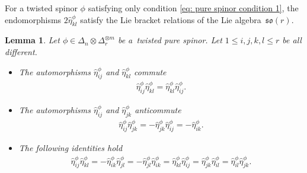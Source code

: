 \documentclass[pdftex]{sigma}
\numberwithin{equation}{section}
\newtheorem{Lemma}[Theorem]{Lemma}
\begin{document}
\begin{Remark} For a twisted spinor $\phi$ satisfying only condition \eqref{eq: pure spinor condition 1}, the endomorphisms $2\hat\eta_{kl}^\phi$ satisfy the Lie bracket relations of the Lie algebra~$\mathfrak{so}(r)$.
\end{Remark}

\begin{Lemma}\label{lemma:clifford-relations} Let $\phi\in\Delta_n\otimes\Delta_r^{\otimes m}$ be a~twisted pure spinor. Let $1\leq i,j,k,l\leq r$ be all different.
\begin{itemize}\itemsep=0pt
 \item The automorphisms $\hat\eta_{ij}^\phi$ and $\hat\eta_{kl}^\phi$ commute
\begin{gather}
\hat\eta_{ij}^\phi\hat\eta_{kl}^\phi=\hat\eta_{kl}^\phi\hat\eta_{ij}^\phi.\label{ij.kl=kl.ij}
\end{gather}
\item The automorphisms $\hat\eta_{ij}^\phi$
and $\hat\eta_{jk}^\phi$ anticommute
\begin{gather}
\hat\eta_{ij}^\phi\hat\eta_{jk}^\phi =-\hat\eta_{jk}^\phi\hat\eta_{ij}^\phi =- \hat\eta_{ik}^\phi.\label{ij.jk=-jk.ij}
\end{gather}
\item The following identities hold
\begin{gather}
 \hat\eta_{ij}^\phi\hat\eta_{kl}^\phi = -\hat\eta_{ik}^\phi\hat\eta_{jl}^\phi
 = -\hat\eta_{jl}^\phi\hat\eta_{ik}^\phi = \hat\eta_{kl}^\phi\hat\eta_{ij}^\phi = \hat\eta_{jk}^\phi\hat\eta_{il}^\phi
 = \hat\eta_{il}^\phi\hat\eta_{jk}^\phi.\label{eq:ijkl=-ikjl}
\end{gather}
\end{itemize}
\end{Lemma}
\end{document}
